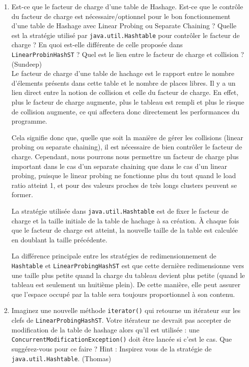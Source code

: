 \documentclass[11pt]{article}
\begin{document}
\begin{enumerate}
\item Est-ce que le facteur de charge d'une table de Hashage. Est-ce que le contrôle du facteur de charge est nécessaire/optionnel pour le bon fonctionnement d'une table de Hashage avec Linear Probing ou Separate Chaining ? Quelle est la stratégie utilisé par \texttt{java.util.Hashtable} pour contrôler le facteur de charge ? En quoi est-elle différente de celle proposée dans \texttt{LinearProbinHashST} ? Quel est le lien entre le facteur de charge et collision ? (Sundeep) \\


Le facteur de charge d'une table de hachage est le rapport entre le nombre d'élements présents dans cette table et le nombre de places libres. Il y a un lien direct entre la notion de collision et celle du facteur de charge. En effet, plus le facteur de charge augmente, plus le tableau est rempli et plus le risque de collision augmente, ce qui affectera donc directement les performances du programme. 

Cela signifie donc que, quelle que soit la manière de gérer les collisions ({linear probing} ou {separate chaining}), il est nécessaire de bien contrôler le facteur de charge. Cependant, nous pourrons nous permettre un facteur de charge plus important dans le cas d'un {separate chaining} que dans le cas d'un {linear probing}, puisque le linear probing ne fonctionne plus du tout quand le load ratio atteint 1, et pour des valeurs proches de très longs clusters peuvent se former.

La stratégie utilisée dans \texttt{java.util.Hashtable} est de fixer le facteur de charge et la taille initiale de la table de hachage à sa création. À chaque fois que le facteur de charge est atteint, la nouvelle taille de la table est calculée en doublant la taille précédente.

La différence principale entre les stratégies de redimensionnement de \texttt{Hashtable} et \texttt{LinearProbingHashST} est que cette dernière redimensionne vers une taille plus petite quand la charge du tableau devient plus petite (quand le tableau est seulement un huitième plein). De cette manière, elle peut assurer que l'espace occupé par la table sera toujours proportionnel à son contenu.

\item Imaginez une nouvelle méthode \texttt{iterator()} qui retourne un itérateur sur les clefs de \texttt{LinearProbingHashST}. Votre itérateur ne devrait pas accepter de modification de la table de hashage alors qu'il est utilisée :
une \texttt{ConcurrentModificationException()} doit être lancée si c'est le cas. Que suggérez-vous pour ce faire ? Hint : Inspirez vous de la stratégie de \texttt{java.util.Hashtable}. (Thomas)\\


\end{enumerate}
\end{document}
